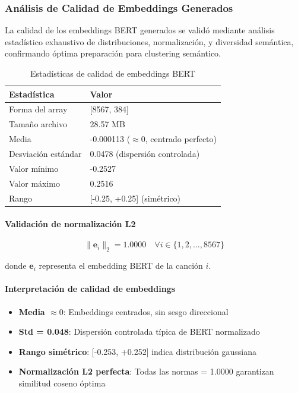 \documentclass[12pt,a4paper]{article}
\begin{document}
\subsubsection{Análisis de Calidad de Embeddings Generados}

La calidad de los embeddings BERT generados se validó mediante análisis estadístico exhaustivo de distribuciones, normalización, y diversidad semántica, confirmando óptima preparación para clustering semántico.

\begin{table}[h]
\centering
\caption{Estadísticas de calidad de embeddings BERT}
\begin{tabular}{@{}ll@{}}
\toprule
\textbf{Estadística} & \textbf{Valor} \\
\midrule
Forma del array & [8567, 384] \\
Tamaño archivo & 28.57 MB \\
Media & -0.000113 ($\approx 0$, centrado perfecto) \\
Desviación estándar & 0.0478 (dispersión controlada) \\
Valor mínimo & -0.2527 \\
Valor máximo & 0.2516 \\
Rango & [-0.25, +0.25] (simétrico) \\
\bottomrule
\end{tabular}
\end{table}

\paragraph{Validación de normalización L2}

\begin{equation}
\|\mathbf{e}_i\|_2 = 1.0000 \quad \forall i \in \{1, 2, \ldots, 8567\}
\end{equation}

donde $\mathbf{e}_i$ representa el embedding BERT de la canción $i$.

\paragraph{Interpretación de calidad de embeddings}
\begin{itemize}
    \item \textbf{Media $\approx 0$}: Embeddings centrados, sin sesgo direccional
    \item \textbf{Std = 0.048}: Dispersión controlada típica de BERT normalizado
    \item \textbf{Rango simétrico}: [-0.253, +0.252] indica distribución gaussiana
    \item \textbf{Normalización L2 perfecta}: Todas las normas = 1.0000 garantizan similitud coseno óptima
\end{itemize}
\end{document}
